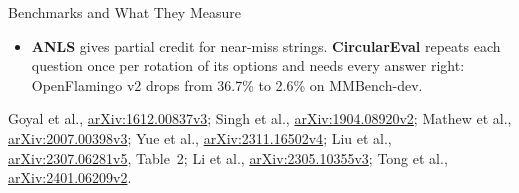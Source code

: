 \begin{frame}{Benchmarks and What They Measure}
\begin{itemize}
    \item \textbf{ANLS} gives partial credit for near-miss strings. \textbf{CircularEval} repeats each question once per rotation of its options and needs every answer right: OpenFlamingo v2 drops from 36.7\% to 2.6\% on MMBench-dev.
  \end{itemize}
  \vspace{0.2em}
  {\scriptsize Goyal et al., \href{https://arxiv.org/abs/1612.00837v3}{arXiv:1612.00837v3}; Singh et al., \href{https://arxiv.org/abs/1904.08920v2}{arXiv:1904.08920v2}; Mathew et al., \href{https://arxiv.org/abs/2007.00398v3}{arXiv:2007.00398v3}; Yue et al., \href{https://arxiv.org/abs/2311.16502v4}{arXiv:2311.16502v4}; Liu et al., \href{https://arxiv.org/abs/2307.06281v5}{arXiv:2307.06281v5}, Table~2; Li et al., \href{https://arxiv.org/abs/2305.10355v3}{arXiv:2305.10355v3}; Tong et al., \href{https://arxiv.org/abs/2401.06209v2}{arXiv:2401.06209v2}.\par}
\end{frame}

